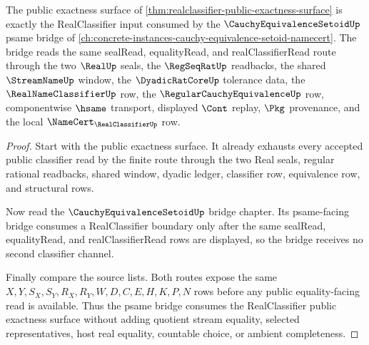 \begin{theorem}
\label{thm:realclassifier-psame-bridge-consumption}
The public exactness surface of \autoref{thm:realclassifier-public-exactness-surface} is exactly the RealClassifier input consumed by the $\CauchyEquivalenceSetoidUp$ psame bridge of \autoref{ch:concrete-instances-cauchy-equivalence-setoid-namecert}. The bridge reads the same sealRead, equalityRead, and realClassifierRead route through the two $\RealUp$ seals, the $\RegSeqRatUp$ readbacks, the shared $\StreamNameUp$ window, the $\DyadicRatCoreUp$ tolerance data, the $\RealNameClassifierUp$ row, the $\RegularCauchyEquivalenceUp$ row, componentwise $\hsame$ transport, displayed $\Cont$ replay, $\Pkg$ provenance, and the local $\NameCert_{\RealClassifierUp}$ row.
\end{theorem}
\begin{proof}
Start with the public exactness surface. It already exhausts every accepted public classifier read by the finite route through the two Real seals, regular rational readbacks, shared window, dyadic ledger, classifier row, equivalence row, and structural rows.

Now read the $\CauchyEquivalenceSetoidUp$ bridge chapter. Its psame-facing bridge consumes a RealClassifier boundary only after the same sealRead, equalityRead, and realClassifierRead rows are displayed, so the bridge receives no second classifier channel.

Finally compare the source lists. Both routes expose the same $X,Y,S_X,S_Y,R_X,R_Y,W,D,C,E,H,K,P,N$ rows before any public equality-facing read is available. Thus the psame bridge consumes the RealClassifier public exactness surface without adding quotient stream equality, selected representatives, host real equality, countable choice, or ambient completeness.
\end{proof}

